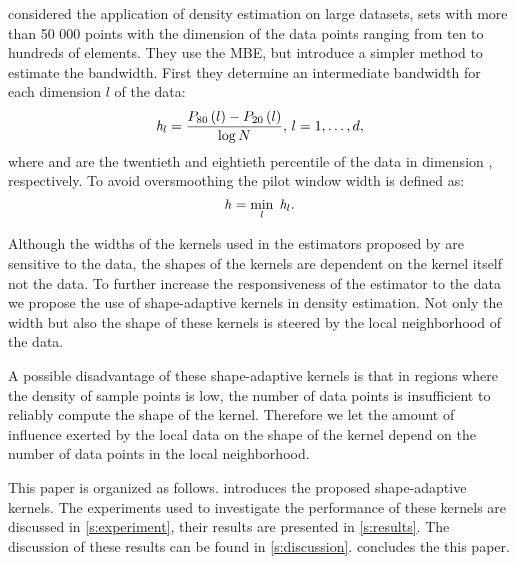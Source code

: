 	\textcite{ferdosi2011comparison} considered the application of density estimation on large datasets, \ie sets with more than 50 000 points with the dimension of the data points ranging from ten to hundreds of elements. They use the MBE, but introduce a simpler method to estimate the bandwidth. First they determine an intermediate bandwidth for each dimension $l$ of the data:
		\begin{equation}\label{eq:1:ferdosiGeneralBandwidth}
			\mathit{h}_{l} = \frac{P_{80}\left( l \right) - P_{20}\left( l \right)}{\log N}, \, l = 1, \dotsc, d,
		\end{equation}
	where  and  are the twentieth and eightieth percentile of the data in dimension \itDim, respectively. 
	To avoid oversmoothing the pilot window width is defined as:
	\begin{equation*}
	 	\mathit{h} = \min_{l} \; \mathit{h}_{l}.
	 \end{equation*}

	Although the widths of the kernels used in the estimators proposed by \citeauthor{breiman1977variable,wilkinson1995dataplot} are sensitive to the data, the shapes of the kernels are dependent on the kernel itself not the data. To further increase the responsiveness of the estimator to the data we propose the use of shape-adaptive kernels in density estimation. Not only the width but also the shape of these kernels is steered by the local neighborhood of the data.

	A possible disadvantage of these shape-adaptive kernels is that in regions where the density of sample points is low, the number of data points is insufficient to reliably compute the shape of the kernel. Therefore we let the amount of influence exerted by the local data on the shape of the kernel depend on the number of data points in the local neighborhood.

	This paper is organized as follows.  introduces the proposed shape-adaptive kernels. The experiments used to investigate the performance of these kernels are discussed in \cref{s:experiment}, their results are presented in \cref{s:results}. The discussion of these results can be found in \cref{s:discussion}.  concludes the this paper. 